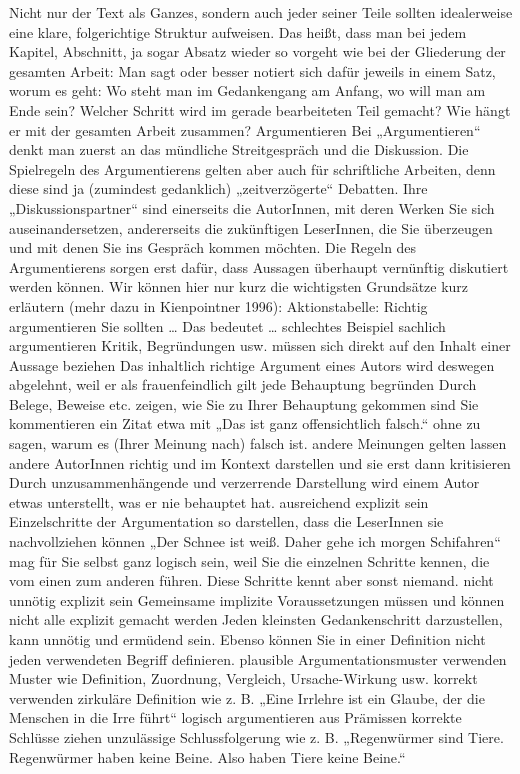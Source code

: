 \documentclass[]{book}
\theoremstyle{definition}
\theoremstyle{definition}
\theoremstyle{definition}
\theoremstyle{remark}
\begin{document}
Nicht nur der Text als Ganzes, sondern auch jeder seiner Teile sollten
idealerweise eine klare, folgerichtige Struktur aufweisen. Das heißt,
dass man bei jedem Kapitel, Abschnitt, ja sogar Absatz wieder so vorgeht
wie bei der Gliederung der gesamten Arbeit: Man sagt oder besser notiert
sich dafür jeweils in einem Satz, worum es geht: Wo steht man im
Gedankengang am Anfang, wo will man am Ende sein? Welcher Schritt wird
im gerade bearbeiteten Teil gemacht? Wie hängt er mit der gesamten
Arbeit zusammen? Argumentieren Bei „Argumentieren`` denkt man zuerst an
das mündliche Streitgespräch und die Diskussion. Die Spielregeln des
Argumentierens gelten aber auch für schriftliche Arbeiten, denn diese
sind ja (zumindest gedanklich) „zeitverzögerte`` Debatten. Ihre
„Diskussionspartner`` sind einerseits die AutorInnen, mit deren Werken
Sie sich auseinandersetzen, andererseits die zukünftigen LeserInnen, die
Sie überzeugen und mit denen Sie ins Gespräch kommen möchten. Die Regeln
des Argumentierens sorgen erst dafür, dass Aussagen überhaupt vernünftig
diskutiert werden können. Wir können hier nur kurz die wichtigsten
Grundsätze kurz erläutern (mehr dazu in Kienpointner 1996):
Aktionstabelle: Richtig argumentieren Sie sollten \ldots{} Das bedeutet
\ldots{} schlechtes Beispiel sachlich argumentieren Kritik, Begründungen
usw. müssen sich direkt auf den Inhalt einer Aussage beziehen Das
inhaltlich richtige Argument eines Autors wird deswegen abgelehnt, weil
er als frauenfeindlich gilt jede Behauptung begründen Durch Belege,
Beweise etc. zeigen, wie Sie zu Ihrer Behauptung gekommen sind Sie
kommentieren ein Zitat etwa mit „Das ist ganz offensichtlich falsch.``
ohne zu sagen, warum es (Ihrer Meinung nach) falsch ist. andere
Meinungen gelten lassen andere AutorInnen richtig und im Kontext
darstellen und sie erst dann kritisieren Durch unzusammenhängende und
verzerrende Darstellung wird einem Autor etwas unterstellt, was er nie
behauptet hat. ausreichend explizit sein Einzelschritte der
Argumentation so darstellen, dass die LeserInnen sie nachvollziehen
können „Der Schnee ist weiß. Daher gehe ich morgen Schifahren`` mag für
Sie selbst ganz logisch sein, weil Sie die einzelnen Schritte kennen,
die vom einen zum anderen führen. Diese Schritte kennt aber sonst
niemand. nicht unnötig explizit sein Gemeinsame implizite
Voraussetzungen müssen und können nicht alle explizit gemacht werden
Jeden kleinsten Gedankenschritt darzustellen, kann unnötig und ermüdend
sein. Ebenso können Sie in einer Definition nicht jeden verwendeten
Begriff definieren. plausible Argumentationsmuster verwenden Muster wie
Definition, Zuordnung, Vergleich, Ursache-Wirkung usw. korrekt verwenden
zirkuläre Definition wie z. B. „Eine Irrlehre ist ein Glaube, der die
Menschen in die Irre führt`` logisch argumentieren aus Prämissen
korrekte Schlüsse ziehen unzulässige Schlussfolgerung wie z. B.
„Regenwürmer sind Tiere. Regenwürmer haben keine Beine. Also haben Tiere
keine Beine.``
\end{document}
